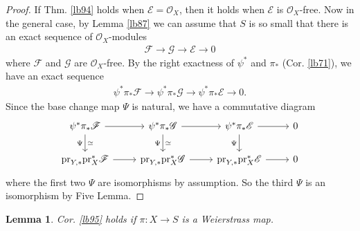 \documentclass[12pt,b5paper,notitlepage]{report}
\theoremstyle{definition}
\theoremstyle{plain}
\newtheorem{lm}[df]{Lemma}
\newcommand{\scr}{\mathscr}
\newcommand{\pr}{\mathrm {pr}}
\numberwithin{equation}{section}
\begin{document}
\begin{proof}
If Thm. \ref{lb94} holds when $\scr E=\scr O_X$, then it holds when $\scr E$ is $\scr O_X$-free. Now in the general case, by Lemma \ref{lb87} we can assume that $S$ is so small that there is an exact sequence of $\scr O_X$-modules
\begin{align*}
\scr F\rightarrow\scr G\rightarrow\scr E\rightarrow0
\end{align*}
where $\scr F$ and $\scr G$ are $\scr O_X$-free. By the right exactness of $\psi^*$ and $\pi_*$ (Cor. \ref{lb71}), we have an exact sequence
\begin{align*}
\psi^*\pi_*\scr F\rightarrow\psi^*\pi_*\scr G\rightarrow\psi^*\pi_*\scr E\rightarrow0.
\end{align*}
Since the base change map $\Psi$ is natural, we have a commutative diagram
\begin{equation*}
\begin{tikzcd}
\psi^*\pi_*\scr F \arrow[r] \arrow[d,"\Psi"',"\simeq"] & \psi^*\pi_*\scr G \arrow[r] \arrow[d,"\Psi"',"\simeq"] & \psi^*\pi_*\scr E \arrow[r] \arrow[d,"\Psi"'] & 0 \\
\pr_{Y,*}\pr_X^*\scr F \arrow[r]                           & \pr_{Y,*}\pr_X^*\scr G \arrow[r]                           & \pr_{Y,*}\pr_X^*\scr E \arrow[r]                           & 0
\end{tikzcd}
\end{equation*}
where the first two $\Psi$ are isomorphisms by assumption. So the third $\Psi$ is an isomorphism by Five Lemma.
\end{proof}









\begin{lm}
Cor. \ref{lb95} holds if $\pi:X\rightarrow S$ is a Weierstrass map.
\end{lm}
\end{document}

